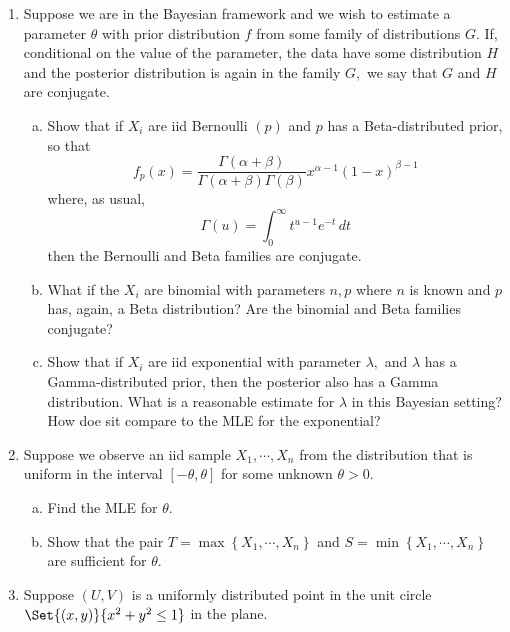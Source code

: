 \documentclass{article}
\begin{document}
\begin{enumerate}
	\item Suppose we are in the Bayesian framework and we wish to estimate a parameter $\theta$ with prior distribution $f$ from some family of distributions $G.$ If, conditional on the value of the parameter, the data have some distribution $H$ and the posterior distribution is again in the family $G,$ we say that $G$ and $H$ are conjugate.

		\begin{enumerate}[(a)]
			\item Show that if $X_i$ are iid Bernoulli $(p)$ and $p$ has a Beta-distributed prior, so that \[f_p(x)=\frac{\Gamma(\alpha+\beta)}{\Gamma(\alpha+\beta)\Gamma(\beta)}x^{\alpha-1}(1-x)^{\beta-1}\] where, as usual, \[\Gamma(u)=\int_0^\infty t^{u-1}e^{-t}\, dt\] then the Bernoulli and Beta families are conjugate.

			\item What if the $X_i$ are binomial with parameters $n, p$ where $n$ is known and $p$ has, again, a Beta distribution? Are the binomial and Beta families conjugate?

			\item Show that if $X_i$ are iid exponential with parameter $\lambda,$ and $\lambda$ has a Gamma-distributed prior, then the posterior also has a Gamma distribution. What is a reasonable estimate for $\lambda$ in this Bayesian setting? How doe sit compare to the MLE for the exponential?
				
		\end{enumerate}

	\item Suppose we observe an iid sample $X_1, \cdots, X_n$ from the distribution that is uniform in the interval $[-\theta, \theta]$ for some unknown $\theta>0.$

		\begin{enumerate}[(a)]
			\item Find the MLE for $\theta.$

			\item Show that the pair $T=\max\left\{ X_1, \cdots, X_n \right\}$ and $S=\min\left\{ X_1, \cdots, X_n \right\}$ are sufficient for $\theta.$
				
		\end{enumerate}

	\item Suppose $(U, V)$ is a uniformly distributed point in the unit circle $\Set{(x, y)}{x^2+y^2\le 1}$ in the plane. 


\end{enumerate}
\end{document}
